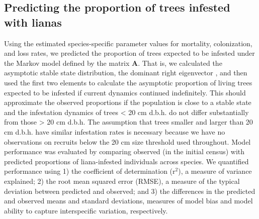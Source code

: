 \documentclass[b5paper,justified]{tufte-book} %
\begin{document}
\begin{fullwidth}
\subsection{Predicting the proportion of trees infested with lianas}
Using the estimated species-specific parameter values for mortality, colonization, and loss rates, we predicted the proportion of trees expected to be infested under the Markov model defined by the matrix \textbf{A}. That is, we calculated the asymptotic stable state distribution, the dominant right eigenvector \citep{Caswell2001}, and then used the first two elements to calculate the asymptotic proportion of living trees expected to be infested if current dynamics continued indefinitely. This should approximate the observed proportions if the population is close to a stable state and the infestation dynamics of trees < 20 cm d.b.h. do not differ substantially from those > 20 cm d.b.h. The assumption that trees smaller and larger than 20 cm d.b.h. have similar infestation rates is necessary because we have no observations on recruits below the 20 cm size threshold used throughout. Model performance was evaluated by comparing observed (in the initial census) with predicted proportions of liana-infested individuals across species. We quantified performance using 1) the coefficient of determination (r$^2$), a measure of variance explained; 2) the root mean squared error (RMSE), a measure of the typical deviation between predicted and observed; and 3) the differences in the predicted and observed means and standard deviations, measures of model bias and model ability to capture interspecific variation, respectively.   


\end{fullwidth}
\end{document}
